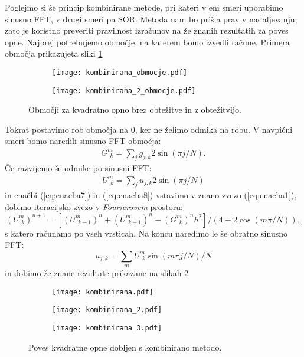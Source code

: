 \documentclass[12pt,a4paper]{article}
\begin{document}
Poglejmo si še princip kombinirane metode, pri kateri v eni smeri uporabimo sinusno FFT, v drugi smeri pa SOR. Metoda nam bo prišla prav v nadaljevanju, zato je koristno preveriti pravilnost izračunov na že znanih rezultatih za poves opne. Najprej potrebujemo območje, na katerem bomo izvedli račune. Primera območja prikazujeta sliki \ref{fig:slika12}
\begin{figure}[H]
    \centering
    \begin{subfigure}[b]{0.45\textwidth}  			
        \texttt{[image: kombinirana\_obmocje.pdf]}
    \end{subfigure}
    \begin{subfigure}[b]{0.45\textwidth}  			
        \texttt{[image: kombinirana\_2\_obmocje.pdf]}
    \end{subfigure}
    \caption{Območji za kvadratno opno brez obtežitve in z obtežitvijo.} \label{fig:slika12}
\end{figure}
\noindent Tokrat postavimo rob območja na 0, ker ne želimo odmika na robu.
V navpični smeri bomo naredili sinusno FFT območja:
\begin{align} \label{eq:enacba7}
G^{m} _{ \ \ k} = \sum_j g_{j,k}2\sin(\pi j/N).
\end{align}
Če razvijemo še odmike po sinusni FFT:
\begin{align}\label{eq:enacba8}
U^{m} _{ \ \ k } =  \sum_j u_{j,k} 2 \sin(\pi j/N)
\end{align}
in enačbi (\ref{eq:enacba7}) in (\ref{eq:enacba8}) vstavimo v znano zvezo (\ref{eq:enacba1}), dobimo iteracijsko zvezo v \textit{Fourierovem} prostoru:
\begin{equation}
(U^{m} _{ \ \ k })^{n+1}= \left[(U^{m} _{ \ \ k-1 })^{n} +(U^{m} _{ \ \ k+1 })^{n} +(G^{m} _{ \ \ k })^{n} h^{2} \right] / (4-2\cos(m \pi /N)),
\end{equation}
s katero računamo po vseh vrsticah. Na koncu naredimo le še obratno sinusno FFT:
\begin{equation}
u_{j,k} = \sum _m U^{m} _{ \ \ k } \sin(m\pi j /N)/N
\end{equation}
in dobimo že znane rezultate prikazane na slikah \ref{fig:slika13}
\begin{figure}[H]
    \centering
    \begin{subfigure}[b]{0.32\textwidth}  			
        \texttt{[image: kombinirana.pdf]}
    \end{subfigure}
    \begin{subfigure}[b]{0.32\textwidth}  			
        \texttt{[image: kombinirana\_2.pdf]}
    \end{subfigure}
    \begin{subfigure}[b]{0.32\textwidth}  			
        \texttt{[image: kombinirana\_3.pdf]}
    \end{subfigure}
    \caption{Poves kvadratne opne dobljen s kombinirano metodo.} \label{fig:slika13}
\end{figure}
\end{document}
